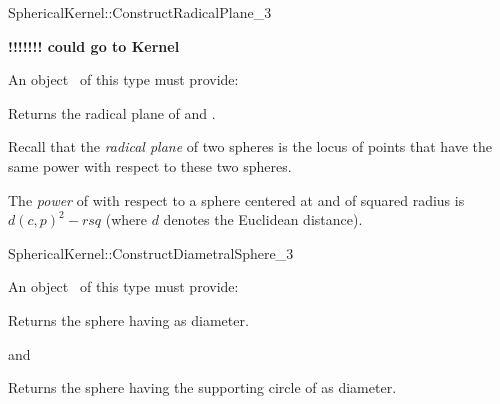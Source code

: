 \begin{ccRefFunctionObjectConcept}{SphericalKernel::ConstructRadicalPlane_3}

\textbf{!!!!!!! could go to Kernel}

An object \ccVar\ of this type must provide:

{Returns the radical plane of  and .}

Recall that the \textit{radical plane} of two spheres is the 
locus of points  that have the same power with respect 
to these two spheres.

The \textit{power} of  with respect to a sphere  centered at 
 and of squared radius  is $ d(c,p)^2 - rsq $
(where $d$ denotes the Euclidean distance). 

\end{ccRefFunctionObjectConcept}
\begin{ccRefFunctionObjectConcept}{SphericalKernel::ConstructDiametralSphere_3}

An object \ccVar\ of this type must provide:

{Returns the sphere having  as diameter.}

and

{Returns the sphere having the supporting circle of  as diameter.}

\end{ccRefFunctionObjectConcept}
